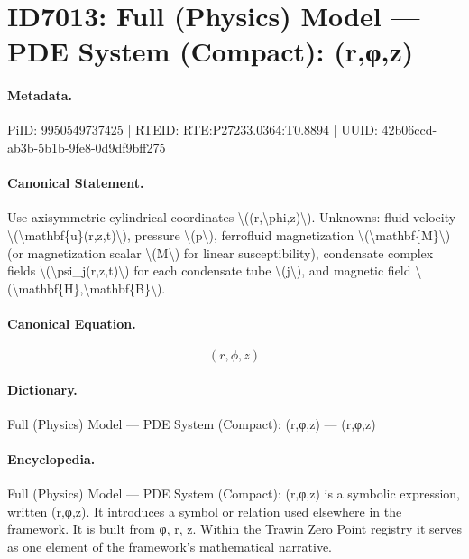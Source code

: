 \section*{ID7013: Full (Physics) Model — PDE System (Compact): (r,φ,z)}
\paragraph{Metadata.}
PiID: 9950549737425 | RTEID: RTE:P27233.0364:T0.8894 | UUID: 42b06ccd-ab3b-5b1b-9fe8-0d9df9bff275

\paragraph{Canonical Statement.}
Use axisymmetric cylindrical coordinates \textbackslash{}((r,\textbackslash{}phi,z)\textbackslash{}). Unknowns: fluid velocity \textbackslash{}(\textbackslash{}mathbf\{u\}(r,z,t)\textbackslash{}), pressure \textbackslash{}(p\textbackslash{}), ferrofluid magnetization \textbackslash{}(\textbackslash{}mathbf\{M\}\textbackslash{}) (or magnetization scalar \textbackslash{}(M\textbackslash{}) for linear susceptibility), condensate complex fields \textbackslash{}(\textbackslash{}psi\_j(r,z,t)\textbackslash{}) for each condensate tube \textbackslash{}(j\textbackslash{}), and magnetic field \textbackslash{}(\textbackslash{}mathbf\{H\},\textbackslash{}mathbf\{B\}\textbackslash{}).

\paragraph{Canonical Equation.}
\[
(r,\phi,z)
\]

\paragraph{Dictionary.}
Full (Physics) Model — PDE System (Compact): (r,φ,z) — (r,φ,z)

\paragraph{Encyclopedia.}
Full (Physics) Model — PDE System (Compact): (r,φ,z) is a symbolic expression, written (r,φ,z). It introduces a symbol or relation used elsewhere in the framework. It is built from φ, r, z. Within the Trawin Zero Point registry it serves as one element of the framework's mathematical narrative.
